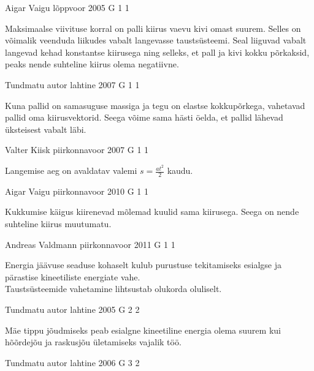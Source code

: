\documentclass[11pt]{article}
\begin{document}
{%
{Aigar Vaigu} %
{lõppvoor} %
{2005} %
{G 1} %
{1} %
{

\ifHint
Maksimaalse viivituse korral on palli kiirus vaevu kivi omast suurem. Selles on võimalik veenduda liikudes vabalt langevasse taustsüsteemi. Seal liiguvad vabalt langevad kehad konstantse kiirusega ning selleks, et pall ja kivi kokku põrkaksid, peaks nende suhteline kiirus olema negatiivne.
\fi
}

{Tundmatu autor} %
{lahtine} %
{2007} %
{G 1} %
{1} %
{

\ifHint
Kuna pallid on samasuguse massiga ja tegu on elastse kokkupõrkega, vahetavad pallid oma kiirusvektorid. Seega võime sama hästi öelda, et pallid lähevad üksteisest vabalt läbi.
\fi
}

{Valter Kiisk} %
{piirkonnavoor} %
{2007} %
{G 1} %
{1} %
{

\ifHint
Langemise aeg on avaldatav valemi $s = \frac{at^2}{2}$ kaudu.
\fi
}

{Aigar Vaigu} %
{piirkonnavoor} %
{2010} %
{G 1} %
{1} %
{

\ifHint
Kukkumise käigus kiirenevad mõlemad kuulid sama kiirusega. Seega on nende suhteline kiirus muutumatu.
\fi
}

{Andreas Valdmann} %
{piirkonnavoor} %
{2011} %
{G 1} %
{1} %
{

\ifHint
\osa Energia jäävuse seaduse kohaselt kulub purustuse tekitamiseks esialgse ja pärastise kineetiliste energiate vahe.\\
\osa Taustsüsteemide vahetamine lihtsustab olukorda oluliselt.
\fi
}

{Tundmatu autor} %
{lahtine} %
{2005} %
{G 2} %
{2} %
{

\ifHint
Mäe tippu jõudmiseks peab esialgne kineetiline energia olema suurem kui hõõrdejõu ja raskusjõu ületamiseks vajalik töö.
\fi
}

{Tundmatu autor} %
{lahtine} %
{2006} %
{G 3} %
{2} %
{

}}
\end{document}
